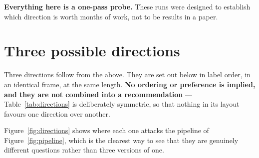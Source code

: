 \documentclass[11pt,a4paper]{article}
\begin{document}
\textbf{Everything here is a one-pass probe.} These runs were designed to
establish which direction is worth months of work, not to be results in a paper.

\section{Three possible directions}
\label{sec:directions}

Three directions follow from the above. They are set out below in label order,
in an identical frame, at the same length. \textbf{No ordering or preference is
implied, and they are not combined into a recommendation} ---
Table~\ref{tab:directions} is deliberately symmetric, so that nothing in its
layout favours one direction over another.

Figure~\ref{fig:directions} shows where each one attacks the pipeline of
Figure~\ref{fig:pipeline}, which is the clearest way to see that they are
genuinely different questions rather than three versions of one.
\end{document}
